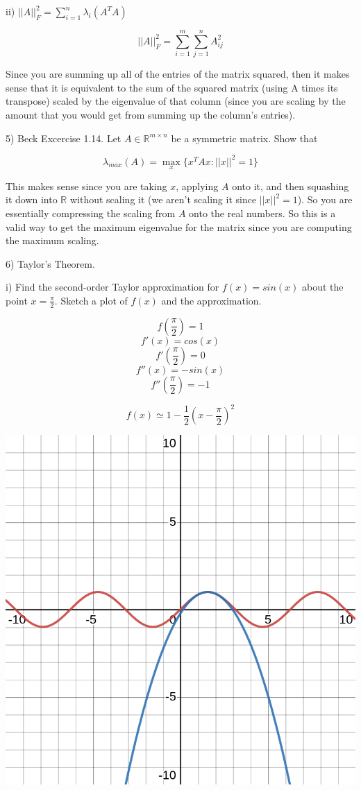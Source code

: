 \documentclass{article}
\begin{document}
\indent \indent ii) $||A||^2_F = \sum_{i = 1}^{n} \lambda_i(A^{T}A)$

\[||A||^2_F = \sum_{i = 1}^{m}\sum_{j = 1}^{n} A^2_{ij}\]

Since you are summing up all of the entries of the matrix squared,
then it makes sense that it is equivalent to the sum of the
squared matrix (using A times its transpose)
scaled by the eigenvalue of that column
(since you are scaling by the amount that you would get
from summing up the column's entries).


5) Beck Excercise 1.14. Let $A \in \mathbb{R}^{m \times n}$
be a symmetric matrix. Show that

\[\lambda_{max}(A) = \max\limits_{x} \{x^{T}Ax: ||x||^2 = 1\}\]

This makes sense since you are taking $x$, applying $A$ onto it,
and then squashing it down into $\mathbb{R}$ without scaling it
(we aren't scaling it since $||x||^2 = 1$).
So you are essentially compressing the scaling from $A$ onto the real numbers.
So this is a valid way to get the maximum eigenvalue for the matrix since
you are computing the maximum scaling.


6) Taylor's Theorem.

\indent \indent i) Find the second-order Taylor approximation for $f(x) = sin(x)$
about the point $x = \frac{\pi}{2}$. Sketch a plot of $f(x)$ and the approximation.

\[f(\frac{\pi}{2}) = 1\]
\[f'(x) = cos(x)\]
\[f'(\frac{\pi}{2}) = 0\]
\[f''(x) = -sin(x)\]
\[f''(\frac{\pi}{2}) = -1\]

\[f(x) \simeq 1 - \frac{1}{2}(x - \frac{\pi}{2})^2\]


\includegraphics[width=\linewidth]{sinx_taylor_polynomial}
\end{document}

